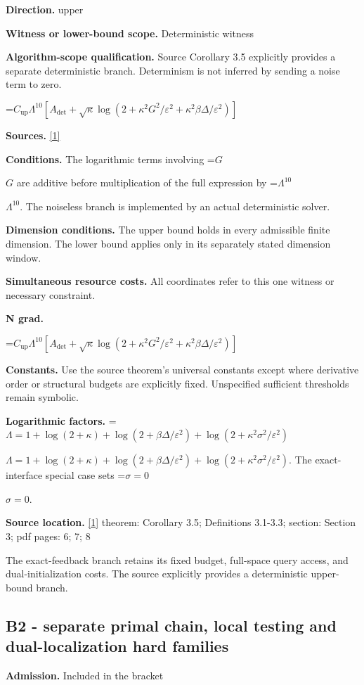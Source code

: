 \documentclass[10pt,a4paper]{article}
\newcommand{\AtlasMath}[1]{\par\begingroup\centering\setbox0=\hbox{$\displaystyle #1$}\ifdim\wd0>1.4\linewidth\typeout{ATLAS WIDE FORMULA: \the\wd0}\fi\ifdim\wd0>\linewidth\resizebox{\linewidth}{!}{\box0}\else\box0\fi\par\endgroup}
\newcommand{\AtlasInlineMath}[1]{\begingroup\setbox0=\hbox{$#1$}\ifdim\wd0>.4\linewidth\endgroup\AtlasMath{#1}\else\endgroup$#1$\fi}
\begin{document}
\textbf{Direction.} upper

\textbf{Witness or lower-bound scope.} Deterministic witness

\textbf{Algorithm-scope qualification.} Source Corollary 3.5 explicitly provides a separate deterministic branch. Determinism is not inferred by sending a noise term to zero.

\AtlasMath{C_{\mathrm{up}}\Lambda^{10}[A_{\mathrm{det}}+\sqrt\kappa\log(2+\kappa^2G^2/\varepsilon^2+\kappa^2\beta\Delta/\varepsilon^2)]}
\textbf{Sources.} \href{https://arxiv.org/pdf/2610.00229v2}{[1]}

\textbf{Conditions.} The logarithmic terms involving \AtlasInlineMath{G} are additive before multiplication of the full expression by \AtlasInlineMath{\Lambda^{10}}. The noiseless branch is implemented by an actual deterministic solver.

\textbf{Dimension conditions.} The upper bound holds in every admissible finite dimension. The lower bound applies only in its separately stated dimension window.

\textbf{Simultaneous resource costs.} All coordinates refer to this one witness or necessary constraint.

\textbf{N grad.}

\AtlasMath{C_{\mathrm{up}}\Lambda^{10}[A_{\mathrm{det}}+\sqrt\kappa\log(2+\kappa^2G^2/\varepsilon^2+\kappa^2\beta\Delta/\varepsilon^2)]}
\textbf{Constants.} Use the source theorem’s universal constants except where derivative order or structural budgets are explicitly fixed. Unspecified sufficient thresholds remain symbolic.

\textbf{Logarithmic factors.} \AtlasInlineMath{\Lambda=1+\log(2+\kappa)+\log(2+\beta\Delta/\varepsilon^2)+\log(2+\kappa^2\sigma^2/\varepsilon^2)}. The exact-interface special case sets \AtlasInlineMath{\sigma=0}.

\textbf{Source location.} \href{https://arxiv.org/pdf/2610.00229v2}{[1]} theorem: Corollary 3.5; Definitions 3.1-3.3; section: Section 3; pdf pages: 6; 7; 8

The exact-feedback branch retains its fixed budget, full-space query access, and dual-initialization costs. The source explicitly provides a deterministic upper-bound branch.

\subsection{B2 - separate primal chain, local testing and dual-localization hard families}
\textbf{Admission.} Included in the bracket
\end{document}
